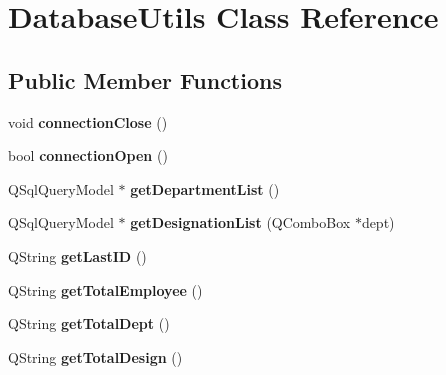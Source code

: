 \hypertarget{class_database_utils}{}\section{Database\+Utils Class Reference}
\label{class_database_utils}
\subsection*{Public Member Functions}
\begin{DoxyCompactItemize}
\item 
\mbox{\label{class_database_utils_ab8173fcbac13ec5f49ea319bfe5622ee}} 
void {\bfseries connection\+Close} ()
\item 
\mbox{\label{class_database_utils_a4c13f2a205cc6d07691e40c6f9c40de2}} 
bool {\bfseries connection\+Open} ()
\item 
\mbox{\label{class_database_utils_a1e86e1fff2bcf23118cbccc7561c7e77}} 
Q\+Sql\+Query\+Model $\ast$ {\bfseries get\+Department\+List} ()
\item 
\mbox{\label{class_database_utils_ad5cfa5cf873a67543730005dfd7d3d98}} 
Q\+Sql\+Query\+Model $\ast$ {\bfseries get\+Designation\+List} (Q\+Combo\+Box $\ast$dept)
\item 
\mbox{\label{class_database_utils_a1cfc8637be45e2d429f0c631ce510954}} 
Q\+String {\bfseries get\+Last\+ID} ()
\item 
\mbox{\label{class_database_utils_a9816711c985fa1aaf91ab3a3c81c441f}} 
Q\+String {\bfseries get\+Total\+Employee} ()
\item 
\mbox{\label{class_database_utils_adbdfc1fd12c2eb72a4d2a7f19ff96ed5}} 
Q\+String {\bfseries get\+Total\+Dept} ()
\item 
\mbox{\label{class_database_utils_a8885c075ec313840ea820df82f639ac8}} 
Q\+String {\bfseries get\+Total\+Design} ()
\item 
\mbox{\label{class_database_utils_a8c9c375135ab730563d00278fcdaa546}} 

\end{DoxyCompactItemize}
